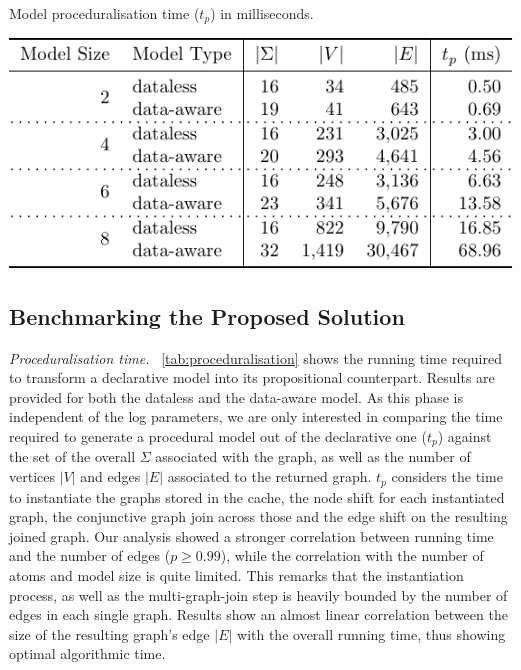 \documentclass[acmengage]{acmart}
\begin{document}
\begin{table}[!t]
\centering
\caption{Model proceduralisation time ($t_p$) in milliseconds.}\label{tab:proceduralisation}
\includegraphics[scale=.7]{fig/tabmod}
\end{table}
\subsection{Benchmarking the Proposed Solution}\label{ssec:proposed}


\textit{Proceduralisation time.} \tablename~\ref{tab:proceduralisation} shows the running time required to transform a declarative model into its propositional counterpart. Results are provided for both the dataless and the data-aware model. As this phase is independent of the log parameters, we are only interested in comparing the time required to generate a procedural model out of the declarative one ($t_p$) against the set of the overall $\Sigma$ associated with the graph, as well as the number of vertices $|V|$ and edges $|E|$ associated to the returned graph. $t_p$ considers the time to instantiate the graphs stored in the cache,  the node shift for each instantiated graph,  the conjunctive graph join across those and the edge shift on the resulting joined graph. Our analysis showed a stronger correlation between running time and the number of edges ($p\geq 0.99$), while the correlation with the number of atoms and model size is quite limited. This remarks that the instantiation process, as well as the multi-graph-join step is heavily bounded by the number of edges in each single graph. Results show an almost linear correlation between the size of the resulting graph's edge $|E|$ with the overall running time, thus showing optimal algorithmic time.\medskip
\end{document}
